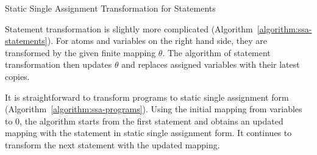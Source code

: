 \begin{algorithm}
\begin{algorithmic}[1]
      \EndCase
      \EndCase
      \EndCase
    \EndMatch
    \EndFunction
  \end{algorithmic}
  \caption{Static Single Assignment Transformation for Statements}
  \label{algorithm:ssa-statements}
\end{algorithm}

Statement transformation is slightly more complicated
(Algorithm~\ref{algorithm:ssa-statements}). For
atoms and variables on the right hand side, they are transformed by the given
finite mapping $\theta$.
The algorithm of statement transformation then updates $\theta$ and
replaces assigned variables with their latest copies.

It is straightforward to transform programs to static single
assignment form (Algorithm~\ref{algorithm:ssa-programs}). Using the
initial mapping from variables to $0$,
the algorithm starts from the first statement and obtains an
updated mapping with the statement in static single assignment form. It
continues to transform the next statement with the updated mapping.

